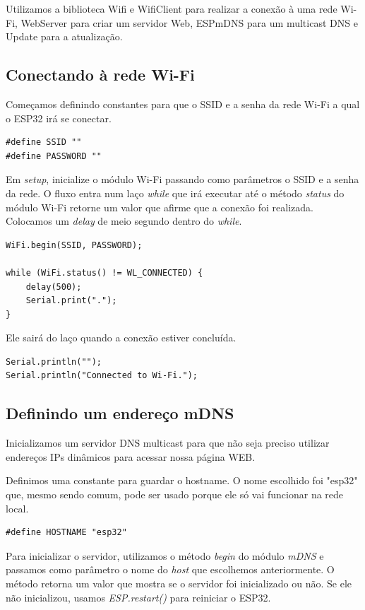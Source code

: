 \documentclass[12pt]{article}
\begin{document}
Utilizamos a biblioteca Wifi e WifiClient para realizar a conexão à uma rede Wi-Fi, WebServer para criar um servidor Web, ESPmDNS para um multicast DNS e Update para a atualização.

\subsection{Conectando à rede Wi-Fi}

Começamos definindo constantes para que o SSID e a senha da rede Wi-Fi a qual o ESP32 irá se conectar.

\begin{lstlisting}
#define SSID ""
#define PASSWORD ""
\end{lstlisting}

Em \textit{setup}, inicialize o módulo Wi-Fi passando como parâmetros o SSID e a senha da rede. O fluxo entra num laço \textit{while} que irá executar até o método \textit{status} do módulo Wi-Fi retorne um valor que afirme que a conexão foi realizada. Colocamos um \textit{delay} de meio segundo dentro do \textit{while}.

\begin{lstlisting}
WiFi.begin(SSID, PASSWORD);

while (WiFi.status() != WL_CONNECTED) {
    delay(500);
    Serial.print(".");
}
\end{lstlisting}

Ele sairá do laço quando a conexão estiver concluída.

\begin{lstlisting}
Serial.println("");
Serial.println("Connected to Wi-Fi.");
\end{lstlisting}

\subsection{Definindo um endereço mDNS}

Inicializamos um servidor DNS multicast para que não seja preciso utilizar endereços IPs dinâmicos para acessar nossa página WEB.

Definimos uma constante para guardar o hostname. O nome escolhido foi "esp32" que, mesmo sendo comum, pode ser usado porque ele só vai funcionar na rede local.

\begin{lstlisting}
#define HOSTNAME "esp32"
\end{lstlisting}

Para inicializar o servidor, utilizamos o método \textit{begin} do módulo \textit{mDNS} e passamos como parâmetro o nome do \textit{host} que escolhemos anteriormente. O método retorna um valor que mostra se o servidor foi inicializado ou não. Se ele não inicializou, usamos \textit{ESP.restart()} para reiniciar o ESP32.
\end{document}
